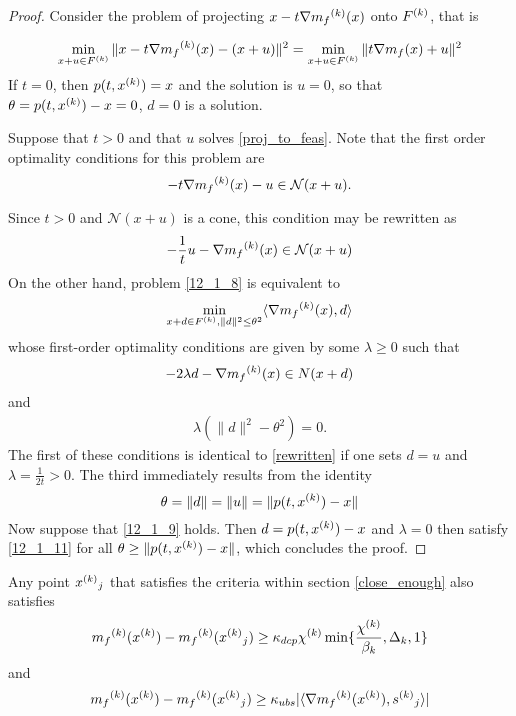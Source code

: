 \documentclass{article}
\begin{document}
\begin{proof}
Consider the problem of projecting $x-t\nabla {{m}_f}^{(k)}(x)$ onto ${F}^{(k)}$, that is

\begin{align}
\label{proj_to_feas}
\min_{x+u \in {F}^{(k)}} \|x-t\nabla {{m}_f}^{(k)}(x) - (x + u) \|^2 = \min_{x+u\in {F}^{(k)}}\|t\nabla m_f(x) + u\|^2
\end{align}
If $t=0$, then $p(t,{x}^{(k)}) = x$ and the solution is $u=0$, so that $\theta = p(t,{x}^{(k)})-x = 0$, $d=0$ is a solution.

Suppose that $t>0$ and that $u$ solves \ref{proj_to_feas}.
Note that the first order optimality conditions for this problem are
\[
-t\nabla {{m}_f}^{(k)}(x)-u \in \mathcal N (x+u).
\]

Since $t>0$ and $\mathcal N(x+u)$ is a cone, this condition may be rewritten as 
\begin{align}
\label{rewritten}
-\frac 1 t u -\nabla {{m}_f}^{(k)}(x) \in \mathcal N(x+u)
\end{align}
On the other hand, problem \ref{12_1_8} is equivalent to
\[\min_{x+d\in {F}^{(k)}, \|d\|^2 \le \theta^2} \langle\nabla {{m}_f}^{(k)}(x), d\rangle \]
whose first-order optimality conditions are given by some $\lambda \ge 0$ such that
\begin{align}
\label{12_1_11}
-2\lambda d-\nabla {{m}_f}^{(k)}(x) \in N(x+d)
\end{align}
and
\begin{align}
\lambda(\|d\|^2-\theta^2) = 0.
\end{align}
The first of these conditions is identical to \ref{rewritten} if one sets $d=u$ and $\lambda=\frac 1 {2t}>0$.
The third immediately results from the identity 
\[
\theta=\|d\| = \|u\|=\|p(t,{x}^{(k)})-x\|
\]
Now suppose that \ref{12_1_9} holds. Then $d=p(t,{x}^{(k)})-x$ and $\lambda=0$ then satisfy \ref{12_1_11} for all $\theta \ge \|p(t,{x}^{(k)})-x\|$, which concludes the proof.


\end{proof}





\begin{theorem}
Any point $ {{x}^{(k)}}_{j} $ that satisfies the criteria within section \ref{close_enough} also satisfies
\[
{{m}_f}^{(k)}({x}^{(k)}) - {{m}_f}^{(k)}({{x}^{(k)}}_{j}) \ge \kappa_{dcp} {\chi^{(k)}} \min\{\frac{{\chi^{(k)}}}{\beta_k}, \Delta_k, 1\}
\]
and
\begin{align}
\label{12_2_6}
{{m}_f}^{(k)}({x}^{(k)}) - {{m}_f}^{(k)}({{x}^{(k)}}_{j}) \ge \kappa_{ubs}|\langle \nabla{{m}_f}^{(k)}({x}^{(k)}), {{s}^{(k)}}_{j}\rangle|
\end{align}

\end{theorem}
\end{document}
